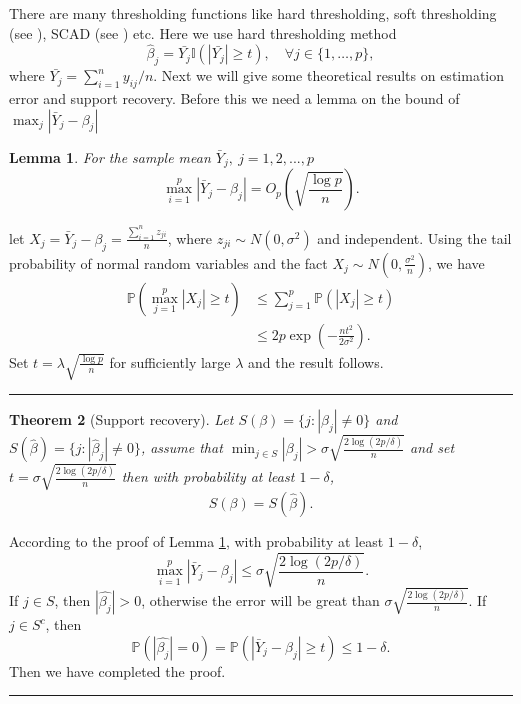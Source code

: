 \documentclass[12pt]{article}
\numberwithin{equation}{section}
\newtheorem{theorem}{Theorem}[section]
\newtheorem{lemma}[theorem]{Lemma}
\newenvironment{proof}{{\bf Proof:}}{\hfill\rule{2mm}{2mm}}
\begin{document}
There are many thresholding functions like hard thresholding, soft thresholding (see \citet{donoho1994ideal}), SCAD (see \citet{Fan2001}) etc. Here we use hard thresholding method
\begin{equation}
\widehat{\beta}_{j}= \bar{Y_j}\mathbb{I}\left(\left|\bar{Y_j}\right| \geq t\right), \quad \forall j \in\{1, \ldots, p\},
\end{equation}
where $\bar{Y_j}=\sum_{i=1}^ny_{ij}/n$. Next we will give some theoretical results on estimation error and support recovery. Before this we need a lemma on the bound of $\max _j\left|\bar Y_{j}-\beta_{j}\right|$
\begin{lemma}\label{lemma1}
	For the sample mean $\bar Y_j,\ j=1,2,...,p$
	\begin{equation}\label{1.4}
	\max _{i=1}^{p}\left|\bar Y_{j}-\beta_{j}\right| = O_p\left(\sqrt{\frac{\log p}{n}}\right).
	\end{equation}
\end{lemma}
\begin{proof}
	let $X_j=\bar Y_{j}-\beta_{j}=\frac{\sum_{i=1}^{n}z_{ji}}{n}$, where $z_{ji}\sim N(0,\sigma^2)$ and independent. Using the tail probability of normal random variables and the fact $X_j\sim N(0,\frac{\sigma^2}{n})$, we have
	\begin{align*}
	\mathbb{P}\left(\max _{j=1}^{p}\left|X_{j}\right|\geq t\right)&\leq \sum_{j=1}^{p}\mathbb{P}\left(\left|X_{j}\right|\geq t\right)\\
	&\leq 2p \exp\left(-\frac{nt^2}{2\sigma^2}\right).
	\end{align*}
	Set $t= \lambda\sqrt{\frac{\log p}{n}}$ for sufficiently large $\lambda$ and the result follows.
\end{proof}
\begin{theorem}[Support recovery]\label{theorem1.2}
	Let $S(\beta)=\{j:|\beta_{j}|\neq 0\}$ and $S(\widehat\beta)=\{j:|\widehat\beta_{j}|\neq 0\}$, assume that $\min_{j\in S}|\beta_{j}|>\sigma \sqrt{\frac{2 \log (2 p / \delta)}{n}}$ and set $t=\sigma \sqrt{\frac{2 \log (2 p / \delta)}{n}}$ then with probability at least $1-\delta$,
	\begin{equation}
	S(\beta)=S(\widehat{\beta}).
	\end{equation}
\end{theorem}
\begin{proof}
	According to the proof of Lemma \ref{lemma1}, with probability at least $1-\delta$,
	$$
	\max _{i=1}^{p}\left|\bar Y_{j}-\beta_{j}\right|\leq \sigma\sqrt{\frac{2 \log (2 p / \delta)}{n}}.
	$$
	If $j\in S$, then $|\widehat{\beta_j}|>0$, otherwise the error will be great than $\sigma\sqrt{\frac{2 \log (2 p / \delta)}{n}}$. If $j \in S^c$, then
	$$
	\mathbb{P}\left(|\widehat{\beta_j}|=0\right)= \mathbb{P}\left(\left|\bar Y_{j}-\beta_{j}\right|\geq t\right)\leq 1-\delta.
	$$
	Then we have completed the proof.
\end{proof}
\end{document}
